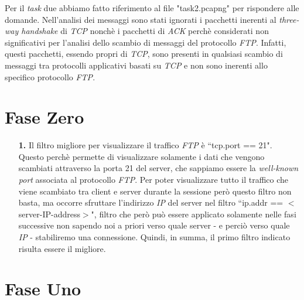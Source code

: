 \documentclass[a4paper, 12pt]{report}
\begin{document}
Per il \textit{task} due abbiamo fatto riferimento al file "task2.pcapng" per rispondere alle domande. Nell'analisi dei messaggi sono stati ignorati i pacchetti inerenti al \textit{three-way handshake}
di \textit{TCP} nonchè i pacchetti di \textit{ACK} perchè considerati non significativi per l'analisi dello scambio di messaggi del protocollo \textit{FTP}. Infatti, questi pacchetti, essendo propri di \textit{TCP},
sono presenti in qualsiasi scambio di messaggi tra protocolli applicativi basati su \textit{TCP} e non sono inerenti allo specifico protocollo \textit{FTP}.

\section{Fase Zero}

\begin{enumerate}
    \item[\textbf{1.}] Il filtro migliore per visualizzare il traffico \textit{FTP} è ``tcp.port == 21". Questo perchè permette di visualizzare
    solamente i dati che vengono scambiati attraverso la porta 21 del server, che sappiamo essere la \textit{well-known port}
    associata al protocollo \textit{FTP}. Per poter visualizzare tutto il traffico che viene scambiato tra client e server durante
    la sessione però questo filtro non basta, ma occorre sfruttare l'indirizzo \textit{IP} del server nel filtro ``ip.addr == $<$server-IP-address$>$",
    filtro che però può essere applicato solamente nelle fasi successive non sapendo noi a priori verso quale server - e perciò verso quale \textit{IP} -
    stabiliremo una connessione. Quindi, in summa, il primo filtro indicato risulta essere il migliore.
\end{enumerate}

\section{Fase Uno}
\end{document}
